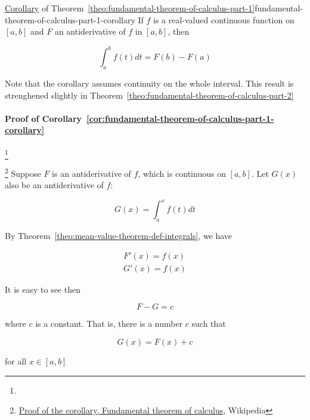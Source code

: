 \begin{Corollary}{\href{https://en.wikipedia.org/wiki/Fundamental\_theorem\_of\_calculus\#Corollary}{Corollary} of Theorem~\ref{theo:fundamental-theorem-of-calculus-part-1}}{fundamental-theorem-of-calculus-part-1-corollary}
    If $f$ is a real-valued continuous function on $[a, b]$ and $F$ an antiderivative of $f$ in $[a, b]$, then

    \begin{equation}
        \int_a^b f(t)dt = F(b) - F(a)
    \end{equation}

    Note that the corollary assumes continuity on the whole interval. This result is strenghened slightly in
    Theorem~\ref{theo:fundamental-theorem-of-calculus-part-2}
\end{Corollary}

\paragraph{Proof of Corollary~\ref{cor:fundamental-theorem-of-calculus-part-1-corollary}}\footnote{}

\footnote{\href{https://en.wikipedia.org/wiki/Fundamental\_theorem\_of\_calculus\#Proof\_of\_the\_corollary}{Proof of the corollary, Fundamental theorem of calculus}, Wikipedia}
Suppose $F$ is an antiderivative of $f$, which is continuous on $[a, b]$. Let $G(x)$ also be an antiderivative of $f$:

\begin{equation}
    G(x) = \int_a^x f(t)dt
\end{equation}

By Theorem~\ref{theo:mean-value-theorem-def-integrals}, we have

\begin{align}
    F'(x) = f(x) \\
    G'(x) = f(x)
\end{align}

It is easy to see then

\begin{equation}
    F - G = c
\end{equation}

where $c$ is a constant. That is, there is a number $c$ such that

\begin{equation}
    G(x) = F(x) + c
\end{equation}

for all $x \in [a, b]$


